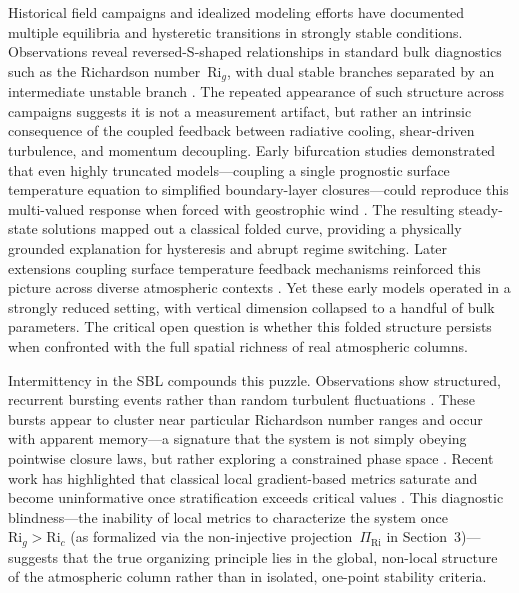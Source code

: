 \documentclass[12pt,a4paper]{article}
\newcommand{\Ric}{\mathrm{Ri}_c}
\newcommand{\Rig}{\mathrm{Ri}_g}
\begin{document}
Historical field campaigns and idealized modeling efforts have documented multiple equilibria and hysteretic transitions in strongly stable conditions. Observations reveal reversed-S-shaped relationships in standard bulk diagnostics such as the Richardson number~$\Rig$, with dual stable branches separated by an intermediate unstable branch \citep{mcnider1993, mcnider1995}. The repeated appearance of such structure across campaigns suggests it is not a measurement artifact, but rather an intrinsic consequence of the coupled feedback between radiative cooling, shear-driven turbulence, and momentum decoupling. Early bifurcation studies demonstrated that even highly truncated models---coupling a single prognostic surface temperature equation to simplified boundary-layer closures---could reproduce this multi-valued response when forced with geostrophic wind \citep{mcnider1995, biazar1995}. The resulting steady-state solutions mapped out a classical folded curve, providing a physically grounded explanation for hysteresis and abrupt regime switching. Later extensions coupling surface temperature feedback mechanisms reinforced this picture across diverse atmospheric contexts \citep{mcnider2012}. Yet these early models operated in a strongly reduced setting, with vertical dimension collapsed to a handful of bulk parameters. The critical open question is whether this folded structure persists when confronted with the full spatial richness of real atmospheric columns.

Intermittency in the SBL compounds this puzzle. Observations show structured, recurrent bursting events rather than random turbulent fluctuations \citep{acevedo2001, poveda1993}. These bursts appear to cluster near particular Richardson number ranges and occur with apparent memory---a signature that the system is not simply obeying pointwise closure laws, but rather exploring a constrained phase space \citep{stull1988}. Recent work has highlighted that classical local gradient-based metrics saturate and become uninformative once stratification exceeds critical values \citep{vandewiel2017, vignon2017}. This diagnostic blindness---the inability of local metrics to characterize the system once~$\Rig > \Ric$ (as formalized via the non-injective projection~$\Pi_{\mathrm{Ri}}$ in Section~3)---suggests that the true organizing principle lies in the global, non-local structure of the atmospheric column rather than in isolated, one-point stability criteria.
\end{document}
